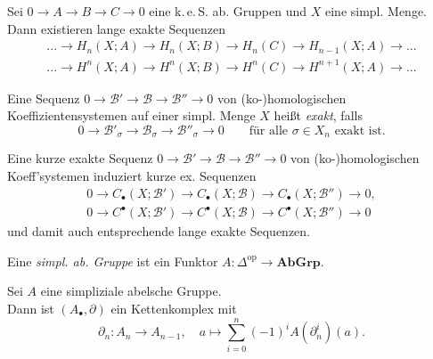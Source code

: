 \documentclass{cheat-sheet}
\newcommand{\AbGrp}{\mathbf{AbGrp}} %
\newcommand{\op}{\mathrm{op}} %
\newcommand{\CC}[1]{{#1}_{\bullet}} %
\newcommand{\CCC}[1]{{#1}^{\bullet}} %
\newcommand{\keS}{k.\,e.\,S.} %
\begin{document}
\begin{kor}
  Sei $0 \to A \to B \to C \to 0$ eine \keS{} ab. Gruppen und $X$ eine simpl. Menge. Dann existieren lange exakte Sequenzen
  \begin{align*}
    ... \to H_n(X; A) \to H_n(X; B) \to H_n(C) \to H_{n-1}(X; A) \to ... \\
    ... \to H^n(X; A) \to H^n(X; B) \to H^n(C) \to H^{n+1}(X; A) \to ...
  \end{align*}
\end{kor}



\begin{defn}
  Eine Sequenz $0 \to \mathcal{B}' \to \mathcal{B} \to \mathcal{B}'' \to 0$ von (ko-)homologischen Koeffizientensystemen auf einer simpl. Menge $X$ heißt \emph{exakt}, falls
  \[
    0 \to \mathcal{B}'_\sigma \to \mathcal{B}_\sigma \to \mathcal{B}''_\sigma \to 0 \qquad
    \text{für alle $\sigma \in X_n$ exakt ist.}
  \]
\end{defn}

\begin{lem}
  Eine kurze exakte Sequenz $0 \to \mathcal{B}' \to \mathcal{B} \to \mathcal{B}'' \to 0$ von (ko-)homologischen Koeff'systemen induziert kurze ex. Sequenzen
  \begin{align*}
    0 \to \CC{C}(X; \mathcal{B}') \to \CC{C}(X; \mathcal{B}) \to \CC{C}(X; \mathcal{B}'') \to 0, \\
    0 \to \CCC{C}(X; \mathcal{B}') \to \CCC{C}(X; \mathcal{B}) \to \CCC{C}(X; \mathcal{B}'') \to 0
  \end{align*}
  und damit auch entsprechende lange exakte Sequenzen.
\end{lem}



\begin{defn}
  Eine \emph{simpl. ab. Gruppe} ist ein Funktor
  $A : \Delta^\op \to \AbGrp$.
\end{defn}

\begin{defn}
  Sei $A$ eine simpliziale abelsche Gruppe. \\
  Dann ist $(A_\bullet, \partial)$ ein Kettenkomplex mit
  \[
    \partial_n : A_n \to A_{n-1}, \quad
    a \mapsto \sum_{i=0}^n (-1)^i A(\partial_n^i)(a).
  \]
\end{defn}
\end{document}
